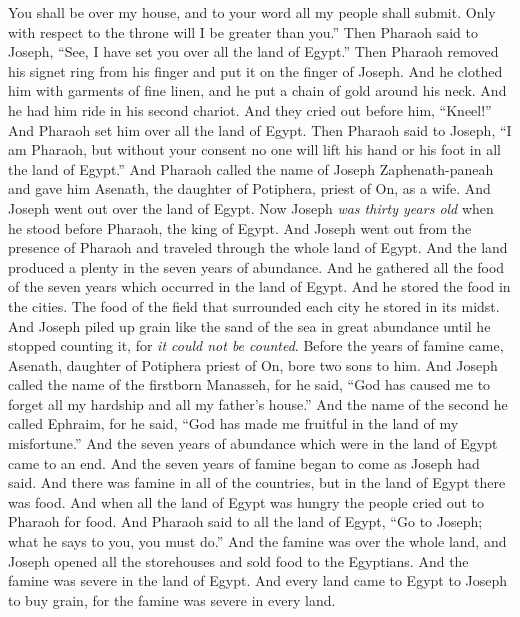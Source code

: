 \begin{biblechapter}
\verse You shall be over my house, and to your word all my people shall submit. Only with respect to the throne will I be greater than you.”
\verse Then Pharaoh said to Joseph, “See, I have set you over all the land of Egypt.”
\verse Then Pharaoh removed his signet ring from his finger and put it on the finger of Joseph. And he clothed him with garments of fine linen, and he put a chain of gold around his neck.
\verse And he had him ride in his second chariot. And they cried out before him, “Kneel!” And Pharaoh set him over all the land of Egypt.
\verse Then Pharaoh said to Joseph, “I am Pharaoh, but without your consent no one will lift his hand or his foot in all the land of Egypt.”
\verse And Pharaoh called the name of Joseph Zaphenath-paneah and gave him Asenath, the daughter of Potiphera, priest of On, as a wife. And Joseph went out over the land of Egypt.
\verse Now Joseph \textit{was thirty years old} when he stood before Pharaoh, the king of Egypt. And Joseph went out from the presence of Pharaoh and traveled through the whole land of Egypt.
\verse And the land produced a plenty in the seven years of abundance.
\verse And he gathered all the food of the seven years which occurred in the land of Egypt. And he stored the food in the cities. The food of the field that surrounded each city he stored in its midst.
\verse And Joseph piled up grain like the sand of the sea in great abundance until he stopped counting it, for \textit{it could not be counted}.
\verse Before the years of famine came, Asenath, daughter of Potiphera priest of On, bore two sons to him.
\verse And Joseph called the name of the firstborn Manasseh, for he said, “God has caused me to forget all my hardship and all my father’s house.”
\verse And the name of the second he called Ephraim, for he said, “God has made me fruitful in the land of my misfortune.”
\verse And the seven years of abundance which were in the land of Egypt came to an end.
\verse And the seven years of famine began to come as Joseph had said. And there was famine in all of the countries, but in the land of Egypt there was food.
\verse And when all the land of Egypt was hungry the people cried out to Pharaoh for food. And Pharaoh said to all the land of Egypt, “Go to Joseph; what he says to you, you must do.”
\verse And the famine was over the whole land, and Joseph opened all the storehouses and sold food to the Egyptians. And the famine was severe in the land of Egypt.
\verse And every land came to Egypt to Joseph to buy grain, for the famine was severe in every land.
\end{biblechapter}

